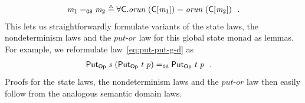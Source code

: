 \documentclass{jfp}
\newcommand{\Conid}[1]{\mathit{#1}}
\newcommand{\Varid}[1]{\mathit{#1}}
\let\Varid\mathit
\let\Conid\mathsf
\begin{document}
\begin{align*}
  \ensuremath{\Varid{m}_{1}} \CEq \ensuremath{\Varid{m}_{2}} \triangleq \forall \ensuremath{\Conid{C}}. \ensuremath{\Varid{orun}\;(\Conid{C}\lbrack\Varid{m}_{1}\rbrack)} = \ensuremath{\Varid{orun}\;(\Conid{C}\lbrack\Varid{m}_{2}\rbrack)} \mbox{~~.}
\end{align*}
This lets us straightforwardly formulate variants of the state laws, the
nondeterminism laws and the \ensuremath{\Varid{put}}-\ensuremath{\Varid{or}} law for this global state monad as
lemmas. For example, we reformulate law~\eqref{eq:put-put-g-d} as
\begin{align*}
  \ensuremath{\Conid{Put}_\Conid{Op}\;\Varid{s}\;(\Conid{Put}_\Conid{Op}\;\Varid{t}\;\Varid{p})} &\CEq \ensuremath{\Conid{Put}_\Conid{Op}\;\Varid{t}\;\Varid{p}} \mbox{~~.}
\end{align*}
Proofs for the state laws, the nondeterminism laws and the \ensuremath{\Varid{put}}-\ensuremath{\Varid{or}} law then
easily follow from the analogous semantic domain laws.
\end{document}
